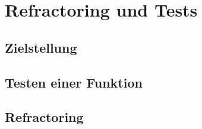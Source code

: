\chapter{Refractoring und Tests}
\label{chp:Refractoring-Tests}
 
\section{Zielstellung}
\section{Testen einer Funktion}
\section{Refractoring}
